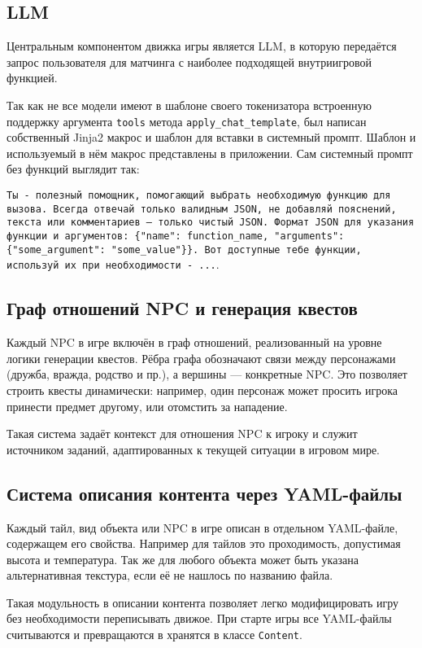 \documentclass[14pt]{extarticle}
\begin{document}
\subsection{LLM}

Центральным компонентом движка игры является LLM, в которую передаётся запрос пользователя для матчинга с наиболее подходящей внутриигровой функцией.

Так как не все модели имеют в шаблоне своего токенизатора встроенную поддержку аргумента \texttt{tools} метода \texttt{apply\_chat\_template}, был написан собственный Jinja2 макрос и шаблон для вставки в системный промпт. Шаблон и используемый в нём макрос представлены в приложении. Сам системный промпт без функций выглядит так:

\texttt{Ты - полезный помощник, помогающий выбрать необходимую функцию для вызова. Всегда отвечай только валидным JSON, не добавляй пояснений, текста или комментариев — только чистый JSON. Формат JSON для указания функции и аргументов: \{"name": function\_name, "arguments": \{"some\_argument": "some\_value"\}\}. Вот доступные тебе функции, используй их при необходимости - ...}.

\subsection{Граф отношений NPC и генерация квестов}

Каждый NPC в игре включён в граф отношений, реализованный на уровне логики генерации квестов. Рёбра графа обозначают связи между персонажами (дружба, вражда, родство и пр.), а вершины — конкретные NPC. Это позволяет строить квесты динамически: например, один персонаж может просить игрока принести предмет другому, или отомстить за нападение.

Такая система задаёт контекст для отношения NPC к игроку и служит источником заданий, адаптированных к текущей ситуации в игровом мире.

\subsection{Система описания контента через YAML-файлы}

Каждый тайл, вид объекта или NPC в игре описан в отдельном YAML-файле, содержащем его свойства. Например для тайлов это проходимость, допустимая высота и температура. Так же для любого объекта может быть указана альтернативная текстура, если её не нашлось по названию файла.

Такая модульность в описании контента позволяет легко модифицировать игру без необходимости переписывать движое. При старте игры все YAML-файлы считываются и превращаются в хранятся в классе \texttt{Content}.
\end{document}
